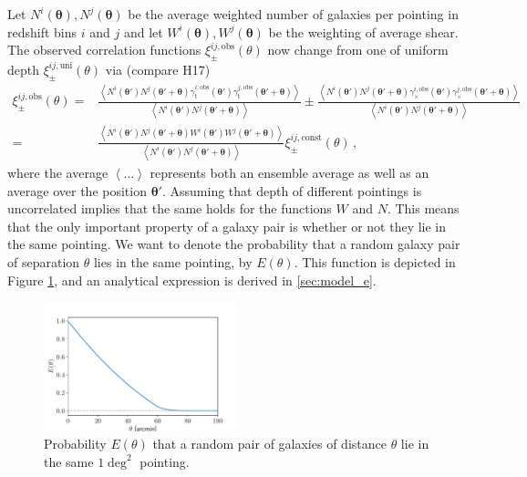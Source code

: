 \documentclass[referee]{aa} %
\renewcommand{\[}{\begin{equation}}
\renewcommand{\]}{\end{equation}}
\renewcommand{\rm}{\mathrm}
\def\b#1{\bm{#1}}
\def\la{\left<}
\def\ra{\right>}
\def\bthp{\b \theta' + \b \theta}
\def\bth{\b \theta'}
\begin{document}
Let $N^i(\b \theta),N^j(\b\theta)$ be the average weighted number of galaxies per pointing in redshift bins $i$ and $j$ and let $W^i(\b \theta),W^j(\b\theta)$ be the weighting of average shear. The observed correlation functions $\xi^{ij,\text{obs}}_\pm(\theta)$ now change from one of uniform depth $\xi_\pm^{ij,\rm{uni}}(\theta)$ via (compare H17)
\begin{align}
\xi^{ij,\text{obs}}_\pm(\theta) = & \frac{\la N^i(\bth)N^j(\bthp)\gamma^{i,\rm{obs}}_{\rm t}(\bth)\gamma^{j,\rm{obs}}_{\rm t}(\bthp)\ra }{\la N^i(\bth)N^j(\bthp)\ra} \pm \frac{\la N^i(\bth)N^j(\bthp)\gamma^{i,\rm{obs}}_\times(\bth)\gamma^{j,\rm{obs}}_\times(\bthp)\ra }{\la N^i(\bth)N^j(\bthp)\ra} \nonumber\\
 = & \frac{\la N^i(\bth)N^j(\bthp)W^i(\bth)W^j(\bthp)\ra}{\la N^i(\bth)N^j(\bthp)\ra} \xi_{\pm}^{ij,\rm{const}}(\theta) \, ,
 \label{eq:xipmblub1}
 \end{align}
 where the average $\la\ldots\ra$ represents both an ensemble average as well as an average over the position $\bth$.
 Assuming that depth of different pointings is uncorrelated implies that the same holds for the functions $W$ and $N$. This means that the only important property of a galaxy pair is whether or not they lie in the same pointing. We want to denote the probability that a random galaxy pair of separation $\theta$ lies in the same pointing, by $E(\theta)$. This function is depicted in Figure \ref{fig:eoftheta_lin}, and an analytical expression is derived in \ref{sec:model_e}.
 
\begin{figure}
 \centering
 \includegraphics[width=0.5\textwidth]{images/eoftheta.pdf}
 \caption{Probability $E(\theta)$ that a random pair of galaxies of distance $\theta$ lie in the same $1\deg ^2$ pointing.}
 \label{fig:eoftheta_lin}
\end{figure}
\end{document}
